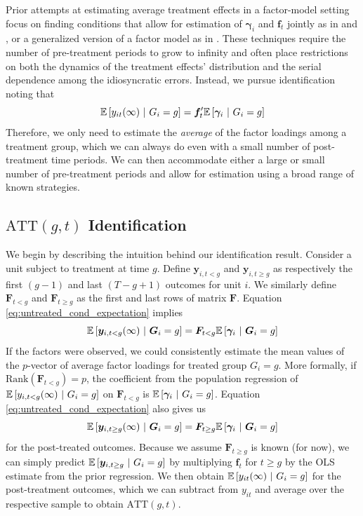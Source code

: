 \documentclass[12pt]{article}
\def\ATT{\text{ATT}}
\begin{document}
Prior attempts at estimating average treatment effects in a factor-model setting focus on finding conditions that allow for estimation of $\bm \gamma_i$ and $\bm f_t$ jointly as in \citet{Gobillon_Magnac_2016} and \citet{Xu_2017}, or a generalized version of a factor model as in \citet{arkhangelsky2021synthetic}. These techniques require the number of pre-treatment periods to grow to infinity and often place restrictions on both the dynamics of the treatment effects' distribution and the serial dependence among the idiosyncratic errors. Instead, we pursue identification noting that 
\begin{equation}\label{eq:untreated_cond_expectation}
\mathbb{E}\left[y_{it}(\infty) \ \vert \ G_i = g\right] = \bm f_t' \mathbb{E}\left[\bm \gamma_i \ \vert \ G_i = g\right]
\end{equation}
Therefore, we only need to estimate the \emph{average} of the factor loadings among a treatment group, which we can always do even with a small number of post-treatment time periods. We can then accommodate either a large or small number of pre-treatment periods and allow for estimation using a broad range of known strategies.

\subsection{$\ATT(g,t)$ Identification}\label{sec:ATT_identification}

We begin by describing the intuition behind our identification result. Consider a unit subject to treatment at time $g$. Define $\bm y_{i,t<g}$ and $\bm y_{i,t\geq g}$ as respectively the first $(g-1)$ and last $(T-g+1)$ outcomes for unit $i$. We similarly define $\bm F_{t < g}$ and $\bm F_{t \geq g}$ as the first and last rows of matrix $\bm F$. Equation \eqref{eq:untreated_cond_expectation} implies
\begin{equation}
  \mathbb{E}\left[\bm y_{i,t < g}(\infty) \ \vert \  \bm G_i = g\right] = \bm F_{t < g} \mathbb{E}\left[\bm \gamma_i \ \vert \ \bm G_i = g\right]
\end{equation}
If the factors were observed, we could consistently estimate the mean values of the $p$-vector of average factor loadings for treated group $G_i = g$. More formally, if $\text{Rank}(\bm F_{t < g}) = p$, the coefficient from the population regression of $\mathbb{E}\left[y_{i,t < g}(\infty)  \ \vert \  G_i = g\right]$ on $\bm F_{t < g}$ is $\mathbb{E}\left[\bm \gamma_i \ \vert \ G_i = g\right]$. Equation \eqref{eq:untreated_cond_expectation} also gives us 
\begin{equation}
  \mathbb{E}\left[\bm y_{i,t \geq g}(\infty) \ \vert \  \bm G_i = g\right] = \bm F_{t \geq g} \mathbb{E}\left[\bm \gamma_i \ \vert \ \bm G_i = g\right]
\end{equation}
for the post-treated outcomes. Because we assume $\bm F_{t \geq g}$ is known (for now), we can simply predict $\mathbb{E}\left[\bm y_{i,t \geq g} \ \vert \ G_i = g\right]$ by multiplying $\bm f_t$ for $t \geq g$ by the OLS estimate from the prior regression. We then obtain $\mathbb{E}\left[y_{it}(\infty) \ \vert \ G_i = g\right]$ for the post-treatment outcomes, which we can subtract from $y_{i t}$ and average over the respective sample to obtain $\text{ATT}(g,t)$. 
\end{document}
